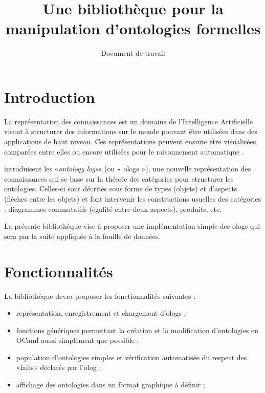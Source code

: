 \documentclass[a4paper]{scrartcl}
\renewcommand{\cite}{\parencite}
\begin{document}
\title{Une bibliothèque pour la manipulation d'ontologies formelles}
\subtitle{Document de travail}

\maketitle


\section{Introduction}

La représentation des connaissances est un domaine de l'Intelligence
Artificielle visant à structurer des informations sur le monde pouvant être
utilisées dans des applications de haut niveau. Ces représentations peuvent
ensuite être visualisées, comparées entre elles ou encore utilisées pour le
raisonnement automatique \cite{brachman-knowledge-representation}.

\textcite{spivak-ologs} introduisent les «\emph{ontology logs}» (ou « ologs »),
une nouvelle représentation des connaissances qui se base sur la théorie des
catégories pour structurer les ontologies. Celles-ci sont décrites sous forme de
types (objets) et d'aspects (flèches entre les objets) et font intervenir les
constructions usuelles des catégories : diagrammes commutatifs (égalité entre
deux aspects), produits, etc.

La présente bibliothèque vise à proposer une implémentation simple des ologs
qui sera par la suite appliquée à la fouille de données.

\section{Fonctionnalités}

La bibliothèque devra proposer les fonctionnalités suivantes :
\begin{itemize}
  \item représentation, enregistrement et chargement d'ologs ;
  \item fonctions génériques permettant la création et la modification
    d'ontologies en OCaml aussi simplement que possible ;
  \item population d'ontologies simples et vérification automatisée du respect
    des «faits» déclarés par l'olog ;
  \item affichage des ontologies dans un format graphique à définir ;
\end{itemize}
\end{document}
